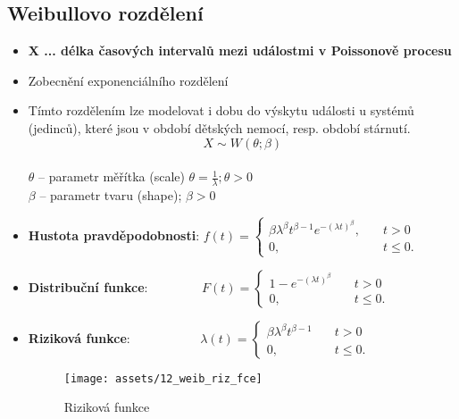\subsection{Weibullovo rozdělení}
\begin{itemize}
    \item \textbf{X ... délka časových intervalů mezi událostmi v Poissonově procesu}
    \item Zobecnění exponenciálního rozdělení
    \item Tímto rozdělením lze modelovat i dobu do výskytu události u systémů (jedinců), které jsou v období dětských nemocí, resp. období stárnutí.
          $$X \sim W(\theta;\beta)$$
          \\ $\theta$ -- parametr měřítka (scale) $\theta = \frac{1}{\lambda}; \theta > 0$ \\ $\beta$ -- parametr tvaru (shape); $\beta > 0$
    \item \textbf{Hustota pravděpodobnosti}:
          $f(t) =  \begin{cases}
                  \beta\lambda^{\beta} t^{\beta-1}e^{-(\lambda t)^{\beta}}, & \quad t > 0     \\
                  0,                                                        & \quad t \leq 0.
              \end{cases}$
    \item \textbf{Distribuční funkce}:
          $\qquad\qquad F(t) =  \begin{cases}
                  1 -  e^{-(\lambda t)^{\beta} } & \quad t > 0     \\
                  0,                             & \quad t \leq 0.
              \end{cases}$
    \item \textbf{Riziková funkce}:
          $\qquad\qquad\quad\; \lambda(t) =  \begin{cases}
                  \beta\lambda^\beta t^{\beta-1} & \quad t > 0     \\
                  0,                             & \quad t \leq 0.
              \end{cases}$
          \begin{figure}[H]
              \centering
              \texttt{[image: assets/12\_weib\_riz\_fce]}
              \caption{Riziková funkce}
          \end{figure}
\end{itemize}
